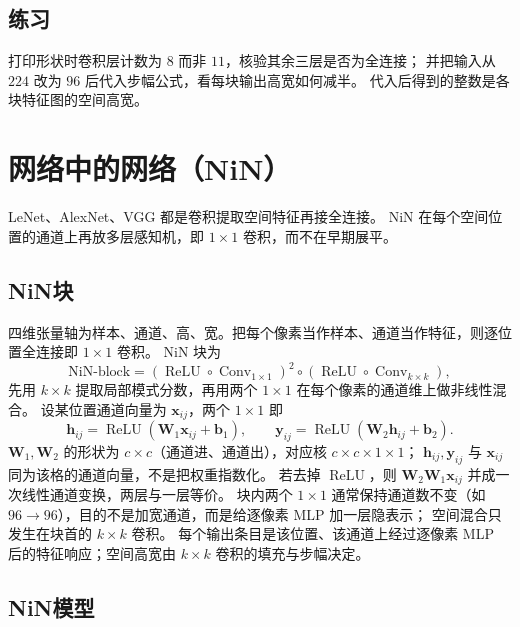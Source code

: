 \subsection{练习}

打印形状时卷积层计数为 $8$ 而非 $11$，核验其余三层是否为全连接；
并把输入从 $224$ 改为 $96$ 后代入步幅公式，看每块输出高宽如何减半。
代入后得到的整数是各块特征图的空间高宽。

\section{网络中的网络（NiN）}



LeNet、AlexNet、VGG 都是卷积提取空间特征再接全连接。
NiN 在每个空间位置的通道上再放多层感知机，即 $1\times 1$ 卷积，而不在早期展平。

\subsection{NiN块}

四维张量轴为样本、通道、高、宽。把每个像素当作样本、通道当作特征，则逐位置全连接即 $1\times 1$ 卷积。
NiN 块为
\[
\mathrm{NiN\text{-}block}
=
(\operatorname{ReLU}\circ\operatorname{Conv}_{1\times 1})^{2}
\circ
(\operatorname{ReLU}\circ\operatorname{Conv}_{k\times k}),
\]
先用 $k\times k$ 提取局部模式分数，再用两个 $1\times 1$ 在每个像素的通道维上做非线性混合。
设某位置通道向量为 $\bm{x}_{ij}$，两个 $1\times 1$ 即
\[
\bm{h}_{ij}=\operatorname{ReLU}(\bm{W}_1\bm{x}_{ij}+\bm{b}_1),\qquad
\bm{y}_{ij}=\operatorname{ReLU}(\bm{W}_2\bm{h}_{ij}+\bm{b}_2).
\]
$\bm{W}_1,\bm{W}_2$ 的形状为 $c\times c$（通道进、通道出），对应核 $c\times c\times 1\times 1$；
$\bm{h}_{ij},\bm{y}_{ij}$ 与 $\bm{x}_{ij}$ 同为该格的通道向量，不是把权重指数化。
若去掉 $\operatorname{ReLU}$，则 $\bm{W}_2\bm{W}_1\bm{x}_{ij}$ 并成一次线性通道变换，两层与一层等价。
块内两个 $1\times 1$ 通常保持通道数不变（如 $96\to 96$），目的不是加宽通道，而是给逐像素 MLP 加一层隐表示；
空间混合只发生在块首的 $k\times k$ 卷积。
每个输出条目是该位置、该通道上经过逐像素 MLP 后的特征响应；空间高宽由 $k\times k$ 卷积的填充与步幅决定。

\subsection{NiN模型}

